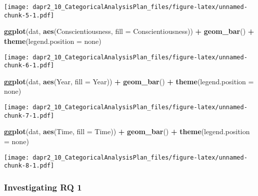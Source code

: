 \documentclass[
]{article}
\newenvironment{Shaded}{\begin{snugshade}}{\end{snugshade}}
\newcommand{\AttributeTok}[1]{\textcolor[rgb]{0.13,0.29,0.53}{#1}}
\newcommand{\FunctionTok}[1]{\textcolor[rgb]{0.13,0.29,0.53}{\textbf{#1}}}
\newcommand{\NormalTok}[1]{#1}
\newcommand{\SpecialCharTok}[1]{\textcolor[rgb]{0.81,0.36,0.00}{\textbf{#1}}}
\newcommand{\StringTok}[1]{\textcolor[rgb]{0.31,0.60,0.02}{#1}}
\begin{document}
\texttt{[image: dapr2\_10\_CategoricalAnalysisPlan\_files/figure-latex/unnamed-chunk-5-1.pdf]}

\begin{Shaded}
\begin{Highlighting}[]
\FunctionTok{ggplot}\NormalTok{(dat, }\FunctionTok{aes}\NormalTok{(Conscientiousness, }\AttributeTok{fill =}\NormalTok{ Conscientiousness)) }\SpecialCharTok{+} \FunctionTok{geom\_bar}\NormalTok{() }\SpecialCharTok{+}
  \FunctionTok{theme}\NormalTok{(}\AttributeTok{legend.position =} \StringTok{\textquotesingle{}none\textquotesingle{}}\NormalTok{)}
\end{Highlighting}
\end{Shaded}

\texttt{[image: dapr2\_10\_CategoricalAnalysisPlan\_files/figure-latex/unnamed-chunk-6-1.pdf]}

\begin{Shaded}
\begin{Highlighting}[]
\FunctionTok{ggplot}\NormalTok{(dat, }\FunctionTok{aes}\NormalTok{(Year, }\AttributeTok{fill =}\NormalTok{ Year)) }\SpecialCharTok{+} \FunctionTok{geom\_bar}\NormalTok{() }\SpecialCharTok{+}
  \FunctionTok{theme}\NormalTok{(}\AttributeTok{legend.position =} \StringTok{\textquotesingle{}none\textquotesingle{}}\NormalTok{)}
\end{Highlighting}
\end{Shaded}

\texttt{[image: dapr2\_10\_CategoricalAnalysisPlan\_files/figure-latex/unnamed-chunk-7-1.pdf]}

\begin{Shaded}
\begin{Highlighting}[]
\FunctionTok{ggplot}\NormalTok{(dat, }\FunctionTok{aes}\NormalTok{(Time, }\AttributeTok{fill =}\NormalTok{ Time)) }\SpecialCharTok{+} \FunctionTok{geom\_bar}\NormalTok{() }\SpecialCharTok{+}
  \FunctionTok{theme}\NormalTok{(}\AttributeTok{legend.position =} \StringTok{\textquotesingle{}none\textquotesingle{}}\NormalTok{)}
\end{Highlighting}
\end{Shaded}

\texttt{[image: dapr2\_10\_CategoricalAnalysisPlan\_files/figure-latex/unnamed-chunk-8-1.pdf]}

\hypertarget{investigating-rq-1}{%
\subsubsection{Investigating RQ 1}\label{investigating-rq-1}}
\end{document}
